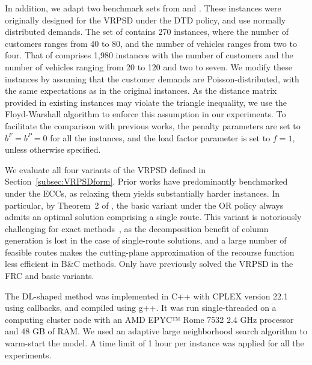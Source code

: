 \documentclass{article}
\begin{document}
In addition, we adapt two benchmark sets from \cite{jabali2014partial} and \cite{parada2024disaggregated}. These instances were originally designed for the VRPSD under the DTD policy, and use normally distributed demands. The set of \cite{jabali2014partial} contains 270 instances, where the number of customers ranges from 40 to 80, and the number of vehicles ranges from two to four. That of \cite{parada2024disaggregated} comprises 1,980 instances with the number of customers and the number of vehicles ranging from 20 to 120 and two to seven. We modify these instances by assuming that the customer demands are Poisson-distributed, with the same expectations as in the original instances. As the distance matrix provided in existing instances may violate the triangle inequality, we use the Floyd-Warshall algorithm to enforce this assumption in our experiments. To facilitate the comparison with previous works, the penalty parameters are set to $b^F = b^P = 0$ for all the instances, and the load factor parameter is set to $f=1$, unless otherwise specified.

We evaluate all four variants of the VRPSD defined in Section~\ref{subsec:VRPSDform}. Prior works have predominantly benchmarked under the ECCs, as relaxing them yields substantially harder instances. In particular, by Theorem~2 of \cite{yang2000stochastic}, the basic variant under the OR policy always admits an optimal solution comprising a single route. This variant is notoriously challenging for exact methods~\cite{florio2020optimal}, as the decomposition benefit of column generation is lost in the case of single-route solutions, and a large number of feasible routes makes the cutting-plane approximation of the recourse function less efficient in B\&C methods. Only \cite{hoogendoorn2025evaluation} have previously solved the VRPSD in the FRC and basic variants. 

The DL-shaped method was implemented in C{\footnotesize ++} with CPLEX version 22.1 using callbacks, and compiled using g{\tiny ++}. It was run single-threaded on a computing cluster node with an AMD EPYC™ Rome 7532 2.4 GHz processor and 48 GB of RAM. We used an adaptive large neighborhood search algorithm \cite{pisinger2007general} to warm-start the model. A time limit of 1 hour per instance was applied for all the experiments.
\end{document}
